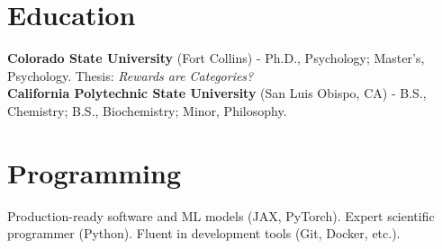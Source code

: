 \documentclass[margin,line]{res}
\begin{document}
\begin{resume}

\vspace{-.3cm}
\section{\sc Education}
{\bf Colorado State University} (Fort Collins) - Ph.D., Psychology; Master's, Psychology. Thesis: \emph{Rewards are Categories?}\\

\vspace*{-.3in}
{\bf California Polytechnic State University} (San Luis Obispo, CA) - B.S., Chemistry; B.S., Biochemistry; Minor, Philosophy.\\

\vspace{-.8cm}
\section{\sc Programming} Production-ready software and ML models (JAX, PyTorch). Expert scientific programmer (Python). Fluent in development tools (Git, Docker, etc.).

    
\vspace{-.4cm} 

\end{resume}
\end{document}
